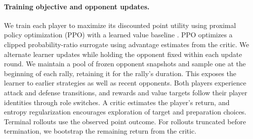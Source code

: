 \documentclass[pmlr]{jmlr}
\newcommand{\attack}{\mathrm{A}}
\newcommand{\defend}{\mathrm{D}}
\begin{document}
\paragraph{Training objective and opponent updates.}
We train each player to maximize its discounted point utility using proximal policy optimization (PPO) with a learned value baseline \citep{schulman2017ppo}. PPO optimizes a clipped probability-ratio surrogate using advantage estimates from the critic.
We alternate learner updates while holding the opponent fixed within each update round. We maintain a pool of frozen opponent snapshots and sample one at the beginning of each rally, retaining it for the rally's duration. This exposes the learner to earlier strategies as well as recent opponents. Both players experience attack and defense transitions, and rewards and value targets follow their player identities through role switches. A critic estimates the player's return, and entropy regularization encourages exploration of target and preparation choices. Terminal rollouts use the observed point outcome. For rollouts truncated before termination, we bootstrap the remaining return from the critic.




\end{document}

